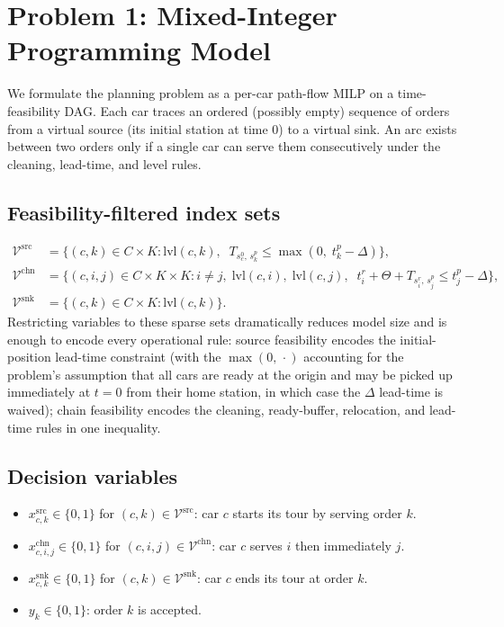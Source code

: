 \documentclass[a4paper, 12pt]{article}
\begin{document}
\section{Problem 1: Mixed-Integer Programming Model}\label{sec:milp}

We formulate the planning problem as a per-car path-flow MILP on a time-feasibility DAG. Each car traces an ordered (possibly empty) sequence of orders from a virtual source (its initial station at time 0) to a virtual sink. An arc exists between two orders only if a single car can serve them consecutively under the cleaning, lead-time, and level rules.

\subsection{Feasibility-filtered index sets}

\begin{align*}
\mathcal{V}^{\text{src}} &= \bigl\{ (c,k)\in C\times K : \mathrm{lvl}(c,k),\;\; T_{s^0_c,\,s^p_k}\le \max(0,\;t^p_k - \Delta)\bigr\}, \\
\mathcal{V}^{\text{chn}} &= \bigl\{ (c,i,j)\in C\times K\times K : i\ne j,\; \mathrm{lvl}(c,i),\; \mathrm{lvl}(c,j),\;\; t^r_i + \Theta + T_{s^r_i,\,s^p_j} \le t^p_j - \Delta\bigr\}, \\
\mathcal{V}^{\text{snk}} &= \bigl\{ (c,k)\in C\times K : \mathrm{lvl}(c,k)\bigr\}.
\end{align*}
Restricting variables to these sparse sets dramatically reduces model size and is enough to encode every operational rule: source feasibility encodes the initial-position lead-time constraint (with the $\max(0,\,\cdot)$ accounting for the problem's assumption that all cars are ready at the origin and may be picked up immediately at $t=0$ from their home station, in which case the $\Delta$ lead-time is waived); chain feasibility encodes the cleaning, ready-buffer, relocation, and lead-time rules in one inequality.

\subsection{Decision variables}

\begin{itemize}
\item $x^{\text{src}}_{c,k}\in\{0,1\}$ for $(c,k)\in\mathcal{V}^{\text{src}}$: car $c$ starts its tour by serving order $k$.
\item $x^{\text{chn}}_{c,i,j}\in\{0,1\}$ for $(c,i,j)\in\mathcal{V}^{\text{chn}}$: car $c$ serves $i$ then immediately $j$.
\item $x^{\text{snk}}_{c,k}\in\{0,1\}$ for $(c,k)\in\mathcal{V}^{\text{snk}}$: car $c$ ends its tour at order $k$.
\item $y_k\in\{0,1\}$: order $k$ is accepted.
\end{itemize}
\end{document}
